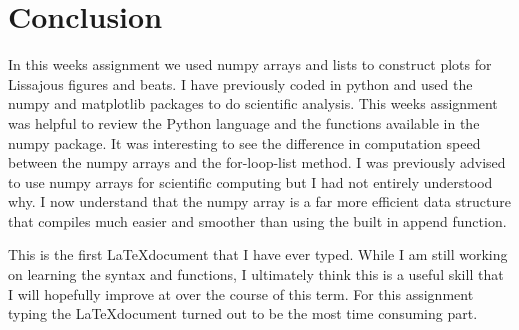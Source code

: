 \documentclass{article}
\begin{document}
 \section{Conclusion}
 In this weeks assignment we used numpy arrays and lists to construct plots for Lissajous figures and beats. I have previously coded in python and used the numpy and matplotlib packages to do scientific analysis. This weeks assignment was helpful to review the Python language and the functions available in the numpy package. It was interesting to see the difference in computation speed between the numpy arrays and the for-loop-list method. I was previously advised to use numpy arrays for scientific computing but I had not entirely understood why. I now understand that the numpy array is a far more efficient data structure that compiles much easier and smoother than using the built in append function. 
 
This is the first \LaTeX  document that I have ever typed. While I am still working on learning the syntax and functions, I ultimately think this is a useful skill that I will hopefully improve at over the course of this term. For this assignment typing the \LaTeX  document turned out to be the most time consuming part. 
\end{document}
